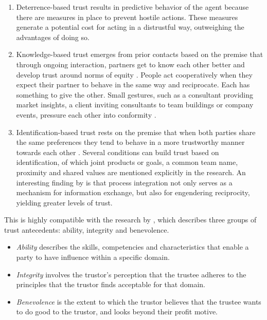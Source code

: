 \documentclass[12pt]{article}
\providecommand{\tightlist}{%
  \setlength{\itemsep}{0pt}\setlength{\parskip}{0pt}}
\begin{document}
\begin{enumerate}
\def\labelenumi{\arabic{enumi}.}
\tightlist
\item
  Deterrence-based trust results in predictive behavior of the agent
  because there are measures in place to prevent hostile actions. These
  measures generate a potential cost for acting in a distrustful way,
  outweighing the advantages of doing so.
\item
  Knowledge-based trust emerges from prior contacts based on the premise
  that through ongoing interaction, partners get to know each other
  better and develop trust around norms of equity \citep[
  92]{gulati1995}. People act cooperatively when they expect their
  partner to behave in the same way and reciprocate. Each has something
  to give the other. Small gestures, such as a consultant providing
  market insights, a client inviting consultants to team buildings or
  company events, pressure each other into conformity \citep[
  63]{macaulay1963}.
\item
  Identification-based trust rests on the premise that when both parties
  share the same preferences they tend to behave in a more trustworthy
  manner towards each other \citep[ 371]{shapiro1992}. Several
  conditions can build trust based on identification, of which joint
  products or goals, a common team name, proximity and shared values are
  mentioned explicitly in the research. An interesting finding by
  \citet[408]{schoenherr2015} is that process integration not only
  serves as a mechanism for information exchange, but also for
  engendering reciprocity, yielding greater levels of trust.
\end{enumerate}

This is highly compatible with the research by
\citet[717-720]{mayer1995}, which describes three groups of trust
antecedents: ability, integrity and benevolence.

\begin{itemize}
\tightlist
\item
  \emph{Ability} describes the skills, competencies and characteristics
  that enable a party to have influence within a specific domain.
\item
  \emph{Integrity} involves the trustor's perception that the trustee
  adheres to the principles that the trustor finds acceptable for that
  domain.
\item
  \emph{Benevolence} is the extent to which the trustor believes that
  the trustee wants to do good to the trustor, and looks beyond their
  profit motive.
\end{itemize}
\end{document}
